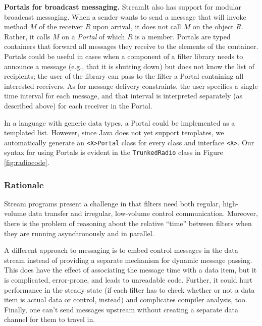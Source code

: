 %
{\bf Portals for broadcast messaging.}  StreamIt also has support for
modular broadcast messaging.  When a sender wants to send a message that
will invoke method $M$ of the receiver $R$ upon arrival, it does not
call $M$ on the object $R$.  Rather, it calls $M$ on a {\it Portal} of
which $R$ is a member.  Portals are typed containers that forward all
messages they receive to the elements of the container.  Portals could
be useful in cases when a component of a filter library needs to
announce a message (e.g., that it is shutting down) but does not know
the list of recipients; the user of the library can pass to the filter a
Portal containing all interested receivers.  As for message delivery
constraints, the user specifies a single time interval for each message,
and that interval is interpreted separately (as described above) for
each receiver in the Portal.

In a language with generic data types, a Portal could be implemented as
a templated list.  However, since Java does not yet support templates,
we automatically generate an {\tt <X>Portal} class for every class and
interface {\tt <X>}.  Our syntax for using Portals is evident in the
{\tt TrunkedRadio} class in Figure \ref{fig:radiocode}.

\subsubsection{Rationale}

Stream programs present a challenge in that filters need both regular,
high-volume data transfer and irregular, low-volume control
communication.  Moreover, there is the problem of reasoning about the
relative ``time'' between filters when they are running asynchronously
and in parallel.

A different approach to messaging is to embed control messages in the
data stream instead of providing a separate mechanism for dynamic
message passing.  This does have the effect of associating the message
time with a data item, but it is complicated, error-prone, and leads
to unreadable code.  Further, it could hurt performance in the steady
state (if each filter has to check whether or not a data item is
actual data or control, instead) and complicates compiler analysis,
too.  Finally, one can't send messages upstream without creating a
separate data channel for them to travel in.


